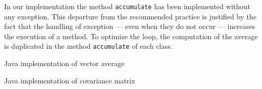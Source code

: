 \documentclass[twoside]{book}
\begin{document}
In our implementation the method {\tt accumulate} has been
implemented without any exception. This departure from the
recommended practice is justified by the fact that the handling of
exception --- even when they do not occur --- increases the
execution of a method. To optimize the loop, the computation of
the average is duplicated in the method {\tt accumulate} of each
class.
\begin{listing} Java implementation of vector average \label{lj:vectoraverage}

\end{listing}

\begin{listing} Java implementation of covariance matrix \label{lj:covmatrix}

\end{listing}
\end{document}
